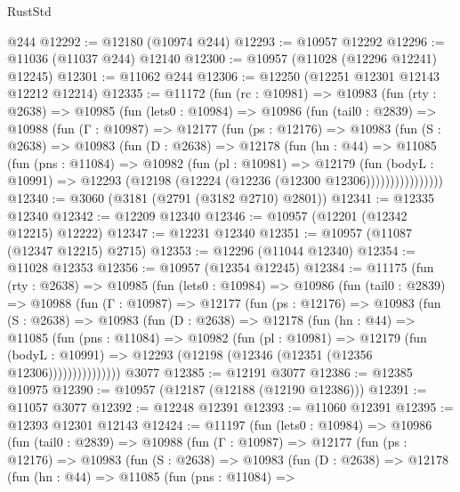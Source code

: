 \begin{lexlean}{RustStd}
\begin{coremodule}
{\begin{coremodule}
{{{{{{{{{{{{{{{{{{{{{{{{{{{{{{{{{    @244
@12292 := @12180 (@10974 @244)
@12293 := @10957 @12292
@12296 := @11036 (@11037 @244) @12140
@12300 := @10957 (@11028 (@12296 @12241) @12245)
@12301 := @11062 @244
@12306 := @12250 (@12251 @12301 @12143 @12212 @12214)
@12335 := @11172
    (fun (rc : @10981) =>
    @10983
      (fun (rty : @2638) =>
      @10985
        (fun (lets0 : @10984) =>
        @10986
          (fun (tail0 : @2839) =>
          @10988
            (fun (Γ : @10987) =>
            @12177
              (fun (ps : @12176) =>
              @10983
                (fun (S : @2638) =>
                @10983
                  (fun (D : @2638) =>
                  @12178
                    (fun (hn : @44) =>
                    @11085
                      (fun (pns : @11084) =>
                      @10982
                        (fun (pl : @10981) =>
                        @12179
                          (fun (bodyL : @10991) =>
                          @12293 (@12198 (@12224 (@12236 (@12300 @12306))))))))))))))))
@12340 := @3060 (@3181 (@2791 (@3182 @2710) @2801))
@12341 := @12335 @12340
@12342 := @12209 @12340
@12346 := @10957 (@12201 (@12342 @12215) @12222)
@12347 := @12231 @12340
@12351 := @10957 (@11087 (@12347 @12215) @2715)
@12353 := @12296 (@11044 @12340)
@12354 := @11028 @12353
@12356 := @10957 (@12354 @12245)
@12384 := @11175
    (fun (rty : @2638) =>
    @10985
      (fun (lets0 : @10984) =>
      @10986
        (fun (tail0 : @2839) =>
        @10988
          (fun (Γ : @10987) =>
          @12177
            (fun (ps : @12176) =>
            @10983
              (fun (S : @2638) =>
              @10983
                (fun (D : @2638) =>
                @12178
                  (fun (hn : @44) =>
                  @11085
                    (fun (pns : @11084) =>
                    @10982
                      (fun (pl : @10981) =>
                      @12179
                        (fun (bodyL : @10991) =>
                        @12293 (@12198 (@12346 (@12351 (@12356 @12306)))))))))))))))
    @3077
@12385 := @12191 @3077
@12386 := @12385 @10975
@12390 := @10957 (@12187 (@12188 (@12190 @12386)))
@12391 := @11057 @3077
@12392 := @12248 @12391
@12393 := @11060 @12391
@12395 := @12393 @12301 @12143
@12424 := @11197
    (fun (lets0 : @10984) =>
    @10986
      (fun (tail0 : @2839) =>
      @10988
        (fun (Γ : @10987) =>
        @12177
          (fun (ps : @12176) =>
          @10983
            (fun (S : @2638) =>
            @10983
              (fun (D : @2638) =>
              @12178
                (fun (hn : @44) =>
                @11085
                  (fun (pns : @11084) =>
}}}}}}}}}}}}}}}}}}}}}}}}}}}}}}}}}
\end{coremodule}}
\end{coremodule}
\end{lexlean}
